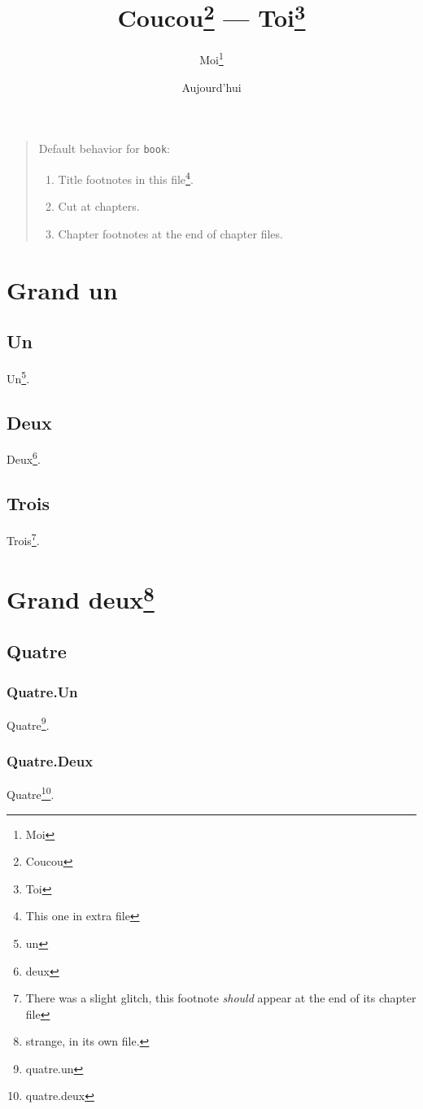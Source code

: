 \documentclass{book}
\begin{document}
\title{Coucou\footnote{Coucou} --- Toi\footnote{Toi}}
\author{Moi\thanks{Moi}}
\date{Aujourd'hui}
\maketitle
\begin{quote}
Default \hacha{} behavior for \texttt{book}:
\begin{enumerate}
\item Title footnotes in this file\footnote{This one in extra file}.
\item Cut at chapters.
\item Chapter footnotes at the end of chapter files.
\end{enumerate}
\end{quote}
\tableofcontents
\part{Grand un}
\chapter{Un}
Un\footnote{un}.
\chapter{Deux}
Deux\footnote{deux}.
\chapter{Trois}
Trois\footnote{There was a slight glitch, this footnote \emph{should}
appear at the end of its chapter file}.
\part{Grand deux\footnote{strange, in its own file.}}
\chapter{Quatre}
\section{Quatre.Un}
Quatre\footnote{quatre.un}.
\section{Quatre.Deux}
Quatre\footnote{quatre.deux}.
\end{document}
